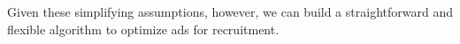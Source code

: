 
Given these simplifying assumptions, however, we can build a straightforward and flexible algorithm to optimize ads for recruitment.

